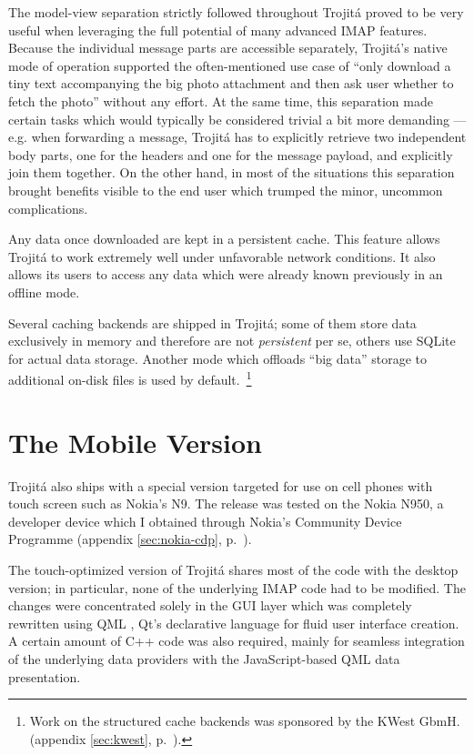 \documentclass[trojita]{subfiles}
\begin{document}
The model-view separation strictly followed throughout Trojitá proved to be very useful when leveraging the full
potential of many advanced IMAP features.  Because the individual message parts are accessible separately, Trojitá's
native mode of operation supported the often-mentioned use case of ``only download a tiny text accompanying the big
photo attachment and then ask user whether to fetch the photo'' without any effort.  At the same time, this separation
made certain tasks which would typically be considered trivial a bit more demanding --- e.g. when forwarding a message,
Trojitá has to explicitly retrieve two independent body parts, one for the headers and one for the message payload, and
explicitly join them together.  On the other hand, in most of the situations this separation brought benefits visible to
the end user which trumped the minor, uncommon complications.

Any data once downloaded are kept in a persistent cache.  This feature allows Trojitá to work extremely well under
unfavorable network conditions.  It also allows its users to access any data which were already known previously in an
offline mode.

Several caching backends are shipped in Trojitá; some of them store data exclusively in memory and therefore are not
{\em persistent} per se, others use SQLite \cite{sqlite} for actual data storage.  Another mode which offloads ``big
data'' storage to additional on-disk files is used by default.~\footnote{Work on the structured cache backends was
sponsored by the KWest GbmH. (appendix \ref{sec:kwest}, p.~\pageref{sec:kwest}).}

\section{The Mobile Version}

Trojitá also ships with a special version targeted for use on cell phones with touch screen such as Nokia's N9.  The
release was tested on the Nokia N950, a developer device which I obtained through Nokia's Community Device Programme
(appendix \ref{sec:nokia-cdp}, p.~\pageref{sec:nokia-cdp}).

The touch-optimized version of Trojitá shares most of the code with the desktop version; in particular, none of the
underlying IMAP code had to be modified.  The changes were concentrated solely in the GUI layer which was completely
rewritten using QML \cite{qml}, Qt's declarative language for fluid user interface creation.  A certain amount of C++
code was also required, mainly for seamless integration of the underlying data providers with the JavaScript-based QML
data presentation.
\end{document}
